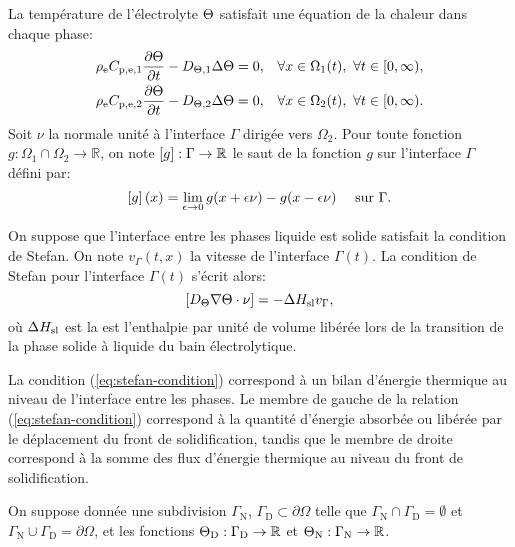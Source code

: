 La température de l'électrolyte $\Theta$ satisfait une équation
de la chaleur dans chaque phase:
\begin{align}
  &\rho_\mathrm{e}C_{\mathrm{p,e,1}} \frac{\partial
    \Theta}{\partial t} - D_{\Theta,\mathrm{1}} \Delta\Theta
  = 0, & \forall x \in \Omega_1(t),\ \forall t\in [0,\infty),\label{eq:heat-solid-phase}\\
    &\rho_\mathrm{e}C_{\mathrm{p,e,2}} \frac{\partial
    \Theta}{\partial t} - D_{\Theta,\mathrm{2}} \Delta\Theta
  = 0, & \forall x \in \Omega_2(t),\ \forall t\in [0,\infty).\label{eq:heat-liquid-phase}
\end{align}
Soit $\nu$ la normale unité à l'interface $\Gamma$ dirigée vers
$\Omega_2$. Pour toute fonction $g:\Omega_1\cap\Omega_2\to\mathbb R$,
on note $\left[ g \right]:\Gamma\to\mathbb R$ le saut de la fonction $g$ sur
l'interface $\Gamma$ défini par:
\begin{equation}
  \left[ g \right](x) = \lim_{\epsilon\to 0}g(x + \epsilon\nu) - g(x -
  \epsilon\nu) \quad \text{ sur } \Gamma.
\end{equation}

On suppose que l'interface entre les phases liquide est solide
satisfait la condition de Stefan. On note $v_\Gamma(t, x)$ la vitesse
de l'interface $\Gamma(t)$. La condition de Stefan pour l'interface
$\Gamma(t)$ s'écrit alors:
\begin{equation}
  \jump{\electrolytetdiff\nabla\temperature \cdot \nu} %
  = - \fusionenthalpy v_\Gamma,
  \label{eq:stefan-condition}
\end{equation}
où $\Delta H_\mathrm{sl}$ est la est l'enthalpie par unité de volume
libérée lors de la transition de la phase solide à liquide du
bain électrolytique.

La condition (\ref{eq:stefan-condition}) correspond à un bilan
d'énergie thermique au niveau de l'interface entre les phases. Le
membre de gauche de la relation (\ref{eq:stefan-condition}) correspond
à la quantité d'énergie absorbée ou libérée par le déplacement du
front de solidification, tandis que le membre de droite correspond à
la somme des flux d'énergie thermique au niveau du front de
solidification.

On suppose donnée une subdivision $\Gamma_\mathrm{N}$,
$\Gamma_\mathrm{D}\subset \partial \Omega$ telle que
$\Gamma_\mathrm{N}\cap \Gamma_\mathrm{D} = \emptyset$ et
$\Gamma_\mathrm{N}\cup \Gamma_\mathrm{D} = \partial \Omega$, et les
fonctions $\Theta_\mathrm{D}:\Gamma_\mathrm{D}\to\mathbb R$ et
$\Theta_\mathrm{N}:\Gamma_\mathrm{N}\to\mathbb R$.

